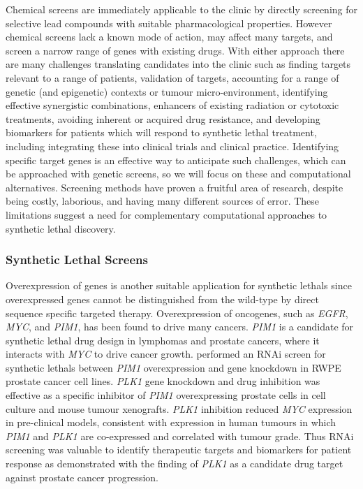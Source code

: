 Chemical screens are immediately applicable to the clinic by directly screening for selective lead compounds with suitable pharmacological properties. However chemical screens lack a known mode of action, may affect many targets, and screen a narrow range of genes with existing drugs. With either approach there are many challenges translating candidates into the clinic such as finding targets relevant to a range of patients, validation of targets, accounting for a range of genetic (and epigenetic) contexts or tumour micro-environment, identifying effective synergistic combinations, enhancers of existing radiation or cytotoxic treatments, avoiding inherent or acquired drug resistance, and developing biomarkers for patients which will respond to \gls{synthetic lethal} treatment, including integrating these into clinical trials and clinical practice. Identifying specific target genes is an effective way to anticipate such challenges, which can be approached with genetic screens, so we will focus on these and computational alternatives. Screening methods have proven a fruitful area of research, despite being costly, laborious, and having many different sources of error. These limitations suggest a need for complementary computational approaches to \gls{synthetic lethal} discovery.  

\subsubsection{Synthetic Lethal Screens}

Overexpression of genes is another suitable application for \glspl{synthetic lethal} since overexpressed genes cannot be distinguished from the wild-type by direct sequence specific targeted therapy. Overexpression of oncogenes, such as \textit{EGFR}, \textit{MYC}, and \textit{PIM1}, has been found to drive many cancers. \textit{PIM1} is a candidate for \gls{synthetic lethal} drug design in lymphomas and prostate cancers, where it interacts with \textit{MYC} to drive cancer growth. \citet{vanderMeer2014} performed an \gls{RNAi} screen for \glspl{synthetic lethal} between \textit{PIM1} overexpression and gene knockdown in RWPE prostate cancer cell lines. \textit{PLK1} gene knockdown and drug inhibition was effective as a specific inhibitor of \textit{PIM1} overexpressing prostate cells in cell culture and mouse tumour xenografts. \textit{PLK1} inhibition reduced \textit{MYC} expression in pre-clinical models, consistent with expression in human tumours in which \textit{PIM1} and \textit{PLK1} are co-expressed and correlated with tumour grade. Thus \gls{RNAi} screening was valuable to identify therapeutic targets and biomarkers for patient response as demonstrated with the finding of \textit{PLK1} as a candidate drug target against prostate cancer progression.  

